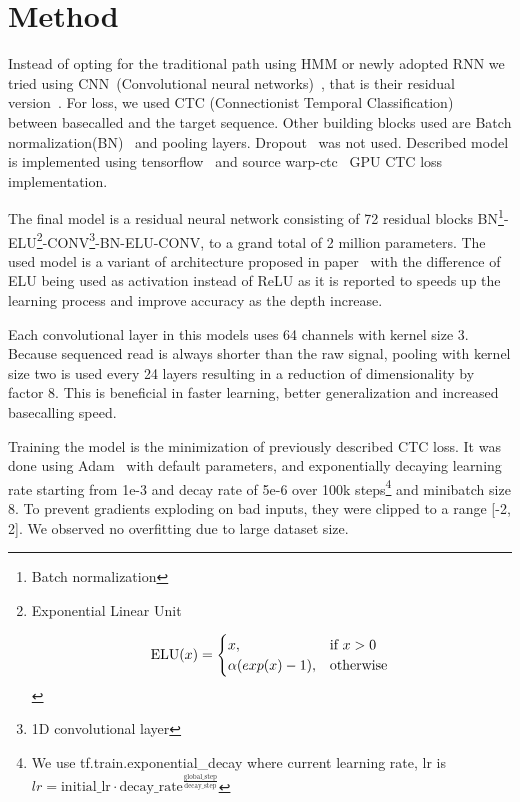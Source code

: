 \documentclass[runningheads,a4paper]{llncs}
\begin{document}
\section{Method}
Instead of opting for the traditional path using HMM or newly adopted RNN we tried using CNN~(Convolutional neural networks)~\cite{lecun-98}, that is their residual version~\cite{he2016deep}. For loss, we used CTC (Connectionist Temporal Classification)~\cite{graves2006connectionist} between basecalled and the target sequence. Other building blocks used are Batch normalization(BN)~\cite{BNORM} and pooling layers. Dropout~\cite{srivastava2014dropout} was not used.
Described model is implemented using tensorflow~\cite{tensorflow2015-whitepaper} and source warp-ctc~\cite{warpctc} GPU CTC loss implementation.

The final model is a residual neural network consisting of 72 residual blocks BN\footnote{Batch normalization}-ELU\footnote{Exponential Linear Unit

    \begin{equation*}
    \text{ELU}(x)=
    \begin{cases}
    x, & \text{if}\ x>0 \\
    \alpha (exp(x) - 1), & \text{otherwise}
    \end{cases}    \\
    \end{equation*}

}-CONV\footnote{1D convolutional layer}-BN-ELU-CONV, to a grand total of 2 million parameters. The used model is a variant of architecture proposed in paper~\cite{identitet} with the difference of ELU being used as activation instead of ReLU as it is reported \cite{resnet-elu} to speeds up the learning process and improve accuracy as the depth increase.

Each convolutional layer in this models uses 64 channels with kernel size 3. Because sequenced read is always shorter than the raw signal, pooling with kernel size two is used every 24 layers resulting in a reduction of dimensionality by factor 8. This is beneficial in faster learning, better generalization and increased basecalling speed.

Training the model is the minimization of previously described CTC loss. It was done using Adam~\cite{adam} with default parameters, and exponentially decaying learning rate starting from 1e-3 and decay rate of 5e-6 over 100k steps\footnote{We use tf.train.exponential\_decay where current learning rate, lr is $lr=\text{initial\_lr} \cdot \text{decay\_rate}^\frac{\text{global\_step}}{\text{decay\_step}}$} and minibatch size 8. To prevent gradients exploding on bad inputs, they were clipped to a range [-2, 2]. We observed no overfitting due to large dataset size.
\end{document}
